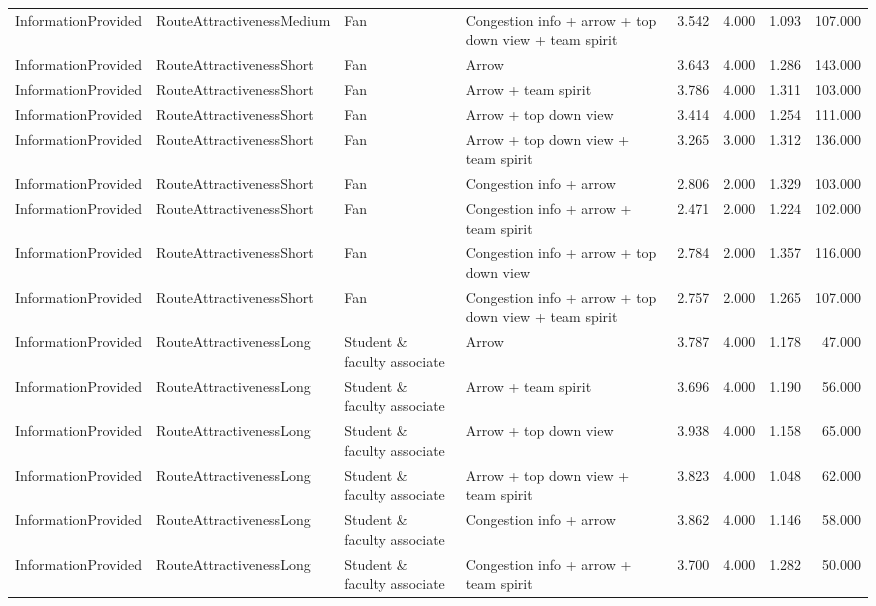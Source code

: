 \begin{tabular}{llllrrrr}
  InformationProvided & RouteAttractivenessMedium & Fan & Congestion info + arrow + top down view + team spirit & 3.542 & 4.000 & 1.093 & 107.000 \\ 
  InformationProvided & RouteAttractivenessShort & Fan & Arrow & 3.643 & 4.000 & 1.286 & 143.000 \\ 
  InformationProvided & RouteAttractivenessShort & Fan & Arrow + team spirit & 3.786 & 4.000 & 1.311 & 103.000 \\ 
  InformationProvided & RouteAttractivenessShort & Fan & Arrow + top down view & 3.414 & 4.000 & 1.254 & 111.000 \\ 
  InformationProvided & RouteAttractivenessShort & Fan & Arrow + top down view + team spirit & 3.265 & 3.000 & 1.312 & 136.000 \\ 
  InformationProvided & RouteAttractivenessShort & Fan & Congestion info + arrow & 2.806 & 2.000 & 1.329 & 103.000 \\ 
  InformationProvided & RouteAttractivenessShort & Fan & Congestion info + arrow + team spirit & 2.471 & 2.000 & 1.224 & 102.000 \\ 
  InformationProvided & RouteAttractivenessShort & Fan & Congestion info + arrow + top down view & 2.784 & 2.000 & 1.357 & 116.000 \\ 
  InformationProvided & RouteAttractivenessShort & Fan & Congestion info + arrow + top down view + team spirit & 2.757 & 2.000 & 1.265 & 107.000 \\ 
  InformationProvided & RouteAttractivenessLong & Student \& faculty associate & Arrow & 3.787 & 4.000 & 1.178 & 47.000 \\ 
  InformationProvided & RouteAttractivenessLong & Student \& faculty associate & Arrow + team spirit & 3.696 & 4.000 & 1.190 & 56.000 \\ 
  InformationProvided & RouteAttractivenessLong & Student \& faculty associate & Arrow + top down view & 3.938 & 4.000 & 1.158 & 65.000 \\ 
  InformationProvided & RouteAttractivenessLong & Student \& faculty associate & Arrow + top down view + team spirit & 3.823 & 4.000 & 1.048 & 62.000 \\ 
  InformationProvided & RouteAttractivenessLong & Student \& faculty associate & Congestion info + arrow & 3.862 & 4.000 & 1.146 & 58.000 \\ 
  InformationProvided & RouteAttractivenessLong & Student \& faculty associate & Congestion info + arrow + team spirit & 3.700 & 4.000 & 1.282 & 50.000 \\ 

\end{tabular}
